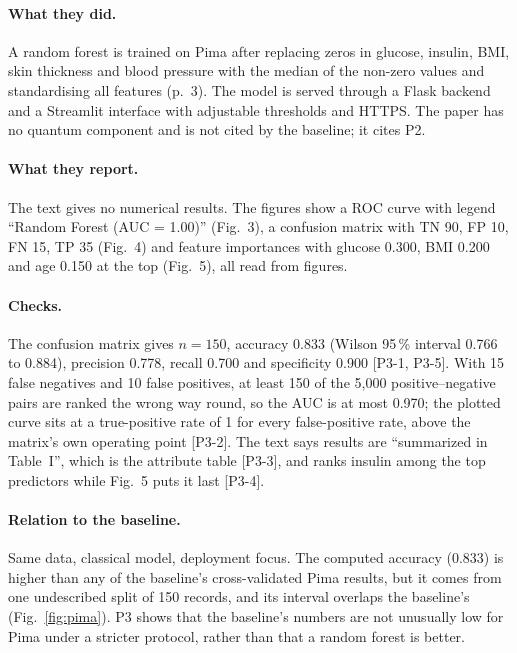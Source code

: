 \documentclass[11pt,a4paper]{article}
\newcommand{\chk}[1]{\textsf{\small [#1]}}
\begin{document}
\paragraph{What they did.} A random forest is trained on Pima after replacing zeros in glucose, insulin, BMI, skin thickness and blood pressure with the median of the non-zero values and standardising all features (p.~3). The model is served through a Flask backend and a Streamlit interface with adjustable thresholds and HTTPS. The paper has no quantum component and is not cited by the baseline; it cites P2.

\paragraph{What they report.} The text gives no numerical results. The figures show a ROC curve with legend ``Random Forest (AUC = 1.00)'' (Fig.~3), a confusion matrix with TN 90, FP 10, FN 15, TP 35 (Fig.~4) and feature importances with glucose 0.300, BMI 0.200 and age 0.150 at the top (Fig.~5), all read from figures.

\paragraph{Checks.} The confusion matrix gives $n=150$, accuracy 0.833 (Wilson 95\,\% interval 0.766 to 0.884), precision 0.778, recall 0.700 and specificity 0.900 \chk{P3-1, P3-5}. With 15 false negatives and 10 false positives, at least 150 of the 5,000 positive--negative pairs are ranked the wrong way round, so the AUC is at most 0.970; the plotted curve sits at a true-positive rate of 1 for every false-positive rate, above the matrix's own operating point \chk{P3-2}. The text says results are ``summarized in Table~I'', which is the attribute table \chk{P3-3}, and ranks insulin among the top predictors while Fig.~5 puts it last \chk{P3-4}.

\paragraph{Relation to the baseline.} Same data, classical model, deployment focus. The computed accuracy (0.833) is higher than any of the baseline's cross-validated Pima results, but it comes from one undescribed split of 150 records, and its interval overlaps the baseline's (Fig.~\ref{fig:pima}). P3 shows that the baseline's numbers are not unusually low for Pima under a stricter protocol, rather than that a random forest is better.
\end{document}
